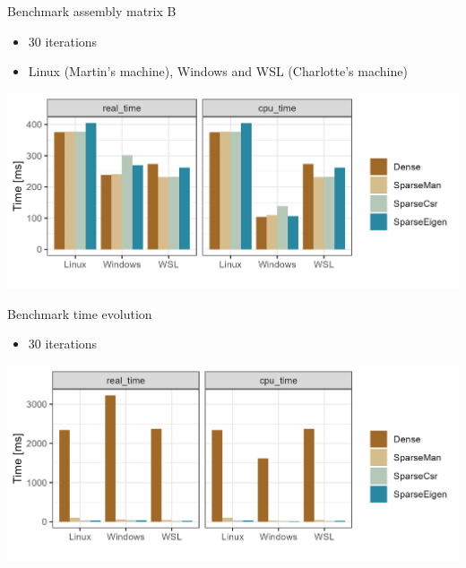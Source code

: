\documentclass[aspectratio=169,xcolor=dvipsnames]{beamer}
\begin{document}
\begin{frame}{Benchmark assembly matrix B}
   
    \begin{itemize}
        \item 30 iterations
        \item Linux (Martin's machine), Windows and WSL (Charlotte's machine)
    \end{itemize}
    
    \begin{center}
   \includegraphics[width=0.8\linewidth]{assembly_bench_result.png}
   \end{center}
   
\end{frame}


\begin{frame}{Benchmark time evolution}
   
    \begin{itemize}
        \item 30 iterations
    \end{itemize}
    
    \begin{center}
   \includegraphics[width=0.8\linewidth]{timeevolution_bench_result.png}
   \end{center}
   
\end{frame}

\end{document}
